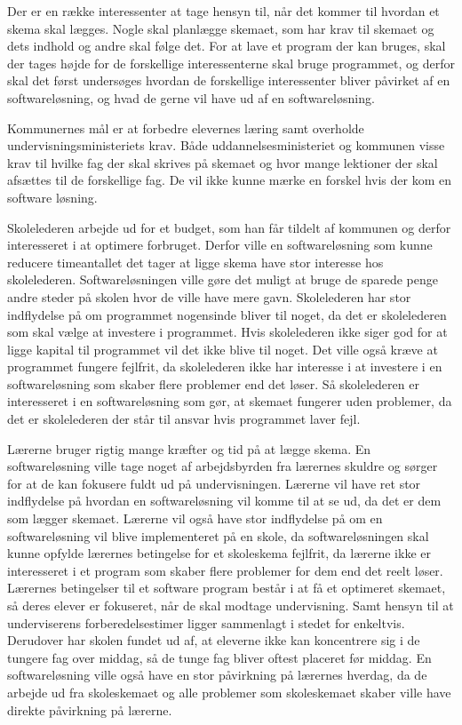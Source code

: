 Der er en række interessenter at tage hensyn til, når det kommer til hvordan et skema skal lægges. Nogle skal planlægge skemaet, som har krav til skemaet og dets indhold og andre skal følge det. For at lave et program der kan bruges, skal der tages højde for de forskellige interessenterne skal bruge programmet, og derfor skal det først undersøges hvordan de forskellige interessenter bliver påvirket af en softwareløsning, og hvad de gerne vil have ud af en softwareløsning. 

Kommunernes mål er at forbedre elevernes læring samt overholde undervisningsministeriets krav. Både uddannelsesministeriet og kommunen visse krav til hvilke fag der skal skrives på skemaet og hvor mange lektioner der skal afsættes til de forskellige fag. De vil ikke kunne mærke en forskel hvis der kom en software løsning\cite{lov2016}.

Skolelederen arbejde ud for et budget, som han får tildelt af kommunen og derfor interesseret i at optimere forbruget. Derfor ville en softwareløsning som kunne reducere timeantallet det tager at ligge skema have stor interesse hos skolelederen. Softwareløsningen ville gøre det muligt at bruge de sparede penge andre steder på skolen hvor de ville have mere gavn. Skolelederen har stor indflydelse på om programmet nogensinde bliver til noget, da det er skolelederen som skal vælge at investere i programmet. Hvis skolelederen ikke siger god for at ligge kapital til programmet vil det ikke blive til noget. Det ville også kræve at programmet fungere fejlfrit, da skolelederen ikke har interesse i at investere i en softwareløsning som skaber flere problemer end det løser. Så skolelederen er interesseret i en softwareløsning som gør, at skemaet fungerer uden problemer, da det er skolelederen der står til ansvar hvis programmet laver fejl\cite{interview}. 

Lærerne bruger rigtig mange kræfter og tid på at lægge skema\cite{interview}. En softwareløsning ville tage noget af arbejdsbyrden fra lærernes skuldre og sørger for at de kan fokusere fuldt ud på undervisningen. Lærerne vil have ret stor indflydelse på hvordan en softwareløsning vil komme til at se ud, da det er dem som lægger skemaet. Lærerne vil også have stor indflydelse på om en softwareløsning vil blive implementeret på en skole, da softwareløsningen skal kunne opfylde lærernes betingelse for et skoleskema fejlfrit, da lærerne ikke er interesseret i et program som skaber flere problemer for dem end det reelt løser. Lærernes betingelser til et software program består i at få et optimeret skemaet, så deres elever er fokuseret, når de skal modtage undervisning. Samt hensyn til at underviserens forberedelsestimer ligger sammenlagt i stedet for enkeltvis. Derudover har skolen fundet ud af, at eleverne ikke kan koncentrere sig i de tungere fag over middag, så de tunge fag bliver oftest placeret før middag. En softwareløsning ville også have en stor påvirkning på lærernes hverdag, da de arbejde ud fra skoleskemaet og alle problemer som skoleskemaet skaber ville have direkte påvirkning på lærerne\cite{interview}. 

